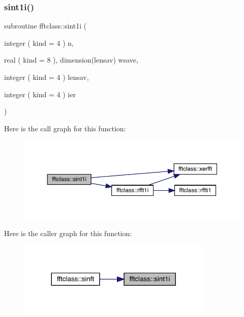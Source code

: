 \subsubsection{\texorpdfstring{sint1i()}{sint1i()}}
{\footnotesize\ttfamily subroutine fftclass\+::sint1i (\begin{DoxyParamCaption}\item[{integer ( kind = 4 )}]{n,  }\item[{real ( kind = 8 ), dimension(lensav)}]{wsave,  }\item[{integer ( kind = 4 )}]{lensav,  }\item[{integer ( kind = 4 )}]{ier }\end{DoxyParamCaption})}

Here is the call graph for this function\+:\nopagebreak
\begin{figure}[H]
\begin{center}
\leavevmode
\includegraphics[width=350pt]{namespacefftclass_ae156ccdcf953af967a42d20df0ddb725_cgraph}
\end{center}
\end{figure}
Here is the caller graph for this function\+:\nopagebreak
\begin{figure}[H]
\begin{center}
\leavevmode
\includegraphics[width=263pt]{namespacefftclass_ae156ccdcf953af967a42d20df0ddb725_icgraph}
\end{center}
\end{figure}
\mbox{\label{namespacefftclass_af29f41f086c8e8901df2716d0b86db20}} 
